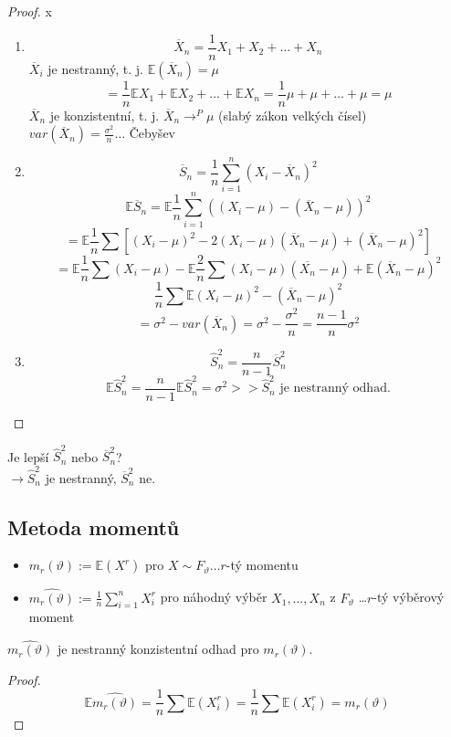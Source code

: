 \documentclass[../main.tex]{subfiles}
\begin{document}
\begin{proof}
{\color{white} x}
\begin{enumerate}
    \item
    \[\overline{X}_n = \frac{1}{n} X_1 + X_2 + \dots + X_n\]
    $\overline{X}_i$ je nestranný, t. j. $\mathbb{E}(\overline{X}_n) = \mu$
    \[ = \frac{1}{n} \mathbb{E}X_1 + \mathbb{E}X_2 + \dots + \mathbb{E}X_n = \frac{1}{n} \mu + \mu + \dots + \mu = \mu\]
    $\overline{X}_n$ je konzistentní, t. j. $\overline{X}_n \rightarrow^P \mu$ (slabý zákon velkých čísel) \\
    $var(\overline{X}_n) = \frac{\sigma^2}{n} \dots$ Čebyšev
    \item
    \[\overline{S}_n = \frac{1}{n} \sum^n_{i=1}(X_i - \overline{X}_n)^2\]
    \[\mathbb{E}\overline{S}_n = \mathbb{E}\frac{1}{n}\sum^n_{i=1}((X_i - \mu) - (\overline{X}_n - \mu))^2\]
    \[ = \mathbb{E}\frac{1}{n}\sum\left[(X_i - \mu)^2 - 2(X_i - \mu)(\overline{X}_n-\mu) + (\overline{X}_n - \mu)^2\right]\]
    \[ = \mathbb{E}\frac{1}{n}\sum(X_i - \mu) - \mathbb{E} \frac{2}{n} \sum (X_i
- \mu)(\overline{X_n}-\mu) + \mathbb{E}(\overline{X}_n - \mu)^2\]
    \[ \frac{1}{n} \sum \mathbb{E}(X_i - \mu)^2 - \mathbb{} (\overline{X}_n - \mu)^2\]
    \[ = \sigma^2 - var(\overline{X}_n) = \sigma^2 - \frac{\sigma^2}{n} = \frac{n-1}{n}\sigma^2\]
    \item
    \[\widehat{S}^2_n = \frac{n}{n-1}\overline{S}^2_n\]
    \[\mathbb{E}\widehat{S}^2_n = \frac{n}{n-1}\mathbb{E}\widehat{S}^2_n =
    \sigma^2 >> \widehat{S}^2_n \text{ je nestranný odhad.}\]
\end{enumerate}
\end{proof}

Je lepší $\widehat{S}^2_n$ nebo $\overline{S}^2_n$?\\
$\rightarrow \widehat{S}^2_n$ je nestranný, $\overline{S}^2_n$ ne.\\

\subsection{Metoda momentů}
\begin{itemize}
    \item $m_r(\vartheta) := \mathbb{E}(X^r)$ pro $X \sim F_\vartheta \dots r$-tý momentu
    \item $\widehat{m_r(\vartheta)}:= \frac{1}{n} \sum^n_{i=1}X^r_i$ pro náhodný výběr $X_1,\dots,X_n$ z $F_\vartheta$ \dots $r$-tý výběrový moment
\end{itemize}
\begin{theorem}
    $\widehat{m_r(\vartheta)}$ je nestranný konzistentní odhad pro $m_r(\vartheta)$.
\end{theorem}
\begin{proof}
    \[\mathbb{E}\widehat{m_r(\vartheta)} = \frac{1}{n} \sum \mathbb{E}(X^r_i) = \frac{1}{n}\sum \mathbb{E}(X^r_i) = m_r(\vartheta)\]
\end{proof}
\end{document}
